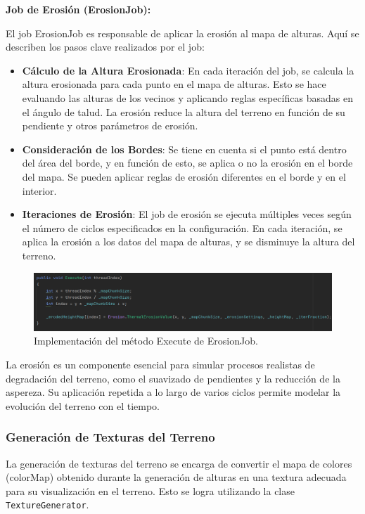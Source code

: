 \textbf{Job de Erosión (ErosionJob):}

El job ErosionJob es responsable de aplicar la erosión al mapa de alturas. Aquí se describen los pasos clave realizados por el job:

\begin{itemize}
\item \textbf{Cálculo de la Altura Erosionada}: En cada iteración del job, se calcula la altura erosionada para cada punto en el mapa de alturas. Esto se hace evaluando las alturas de los vecinos y aplicando reglas específicas basadas en el ángulo de talud. La erosión reduce la altura del terreno en función de su pendiente y otros parámetros de erosión.
\item \textbf{Consideración de los Bordes}: Se tiene en cuenta si el punto está dentro del área del borde, y en función de esto, se aplica o no la erosión en el borde del mapa. Se pueden aplicar reglas de erosión diferentes en el borde y en el interior.
\item \textbf{Iteraciones de Erosión}: El job de erosión se ejecuta múltiples veces según el número de ciclos especificados en la configuración. En cada iteración, se aplica la erosión a los datos del mapa de alturas, y se disminuye la altura del terreno.
\end{itemize}

\begin{figure}[h]
\centering
\includegraphics[width=1\textwidth]{img/codes/ExecuteErosionJob.png}
\caption{Implementación del método Execute de ErosionJob.}
\end{figure}

La erosión es un componente esencial para simular procesos realistas de degradación del terreno, como el suavizado de pendientes y la reducción de la aspereza. Su aplicación repetida a lo largo de varios ciclos permite modelar la evolución del terreno con el tiempo.
\subsubsection{Generación de Texturas del Terreno}

La generación de texturas del terreno se encarga de convertir el mapa de colores (colorMap) obtenido durante la generación de alturas en una textura adecuada para su visualización en el terreno. Esto se logra utilizando la clase \texttt{TextureGenerator}.

